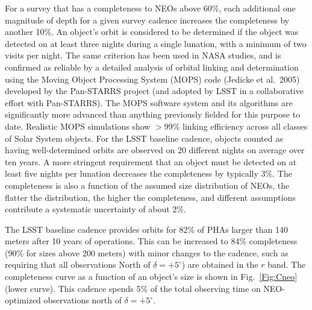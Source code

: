 For a survey that has a completeness to NEOs above 60\%, each
additional one magnitude of depth for a given survey cadence increases
the completeness by another 10\%.  An object's orbit is considered to be
determined if the object was detected on at least three nights during a single
lunation, with a minimum of two visits per night. The same criterion
has been used in NASA studies,
and is confirmed as
reliable by a detailed analysis of orbital linking and determination using
the Moving Object Processing System (MOPS) code (Jedicke et al.~2005) developed by the Pan-STARRS project (and
adopted by LSST in a collaborative effort with Pan-STARRS). The MOPS software
system and its algorithms are significantly more advanced than
anything previously
fielded for this purpose to date. Realistic MOPS simulations show
$>$99\% linking efficiency across all classes of Solar System objects.
For the LSST baseline cadence, objects
counted as having well-determined orbits are observed on 20 different nights on average over ten
years. A more stringent requirement that an object must be detected on at least
five nights per lunation decreases the completeness by typically 3\%.
The completeness is also a function of the assumed size distribution of NEOs, the flatter the distribution, the
higher the completeness, and different assumptions contribute a systematic uncertainty of about 2\%.

The LSST baseline cadence provides orbits for 82\% of PHAs larger than 140
meters after 10 years of operations.  This can be increased to 84\%
completeness (90\% for sizes above 200 meters) with minor changes to
the cadence, such as
requiring that all observations North of $\delta =+5^\circ$) are
obtained in the $r$ band.  The completeness curve as a function of an object's size is shown
in Fig.~\ref{Fig:Cneo} (lower curve). This cadence spends 5\% of the total
observing time on NEO-optimized observations north of $\delta = +5^\circ$.



